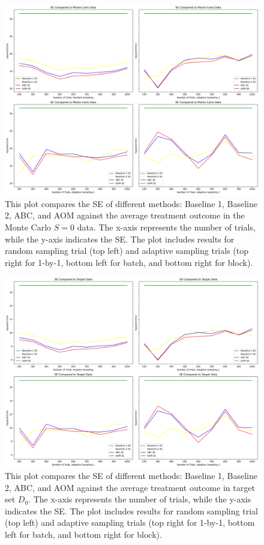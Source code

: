 \documentclass[12pt, oneside]{amsart}
\theoremstyle{definition}
\theoremstyle{remark}
\numberwithin{equation}{section}
\begin{document}
\begin{figure}[hbt!]
    \centering
    \includegraphics[scale=0.15]{Report/Figure/se_mc.jpg}
    \caption{This plot compares the SE of different methods: Baseline 1, Baseline 2, ABC, and AOM against the average treatment outcome in the Monte Carlo $S=0$ data. The x-axis represents the number of trials, while the y-axis indicates the SE. The plot includes results for random sampling trial (top left) and adaptive sampling trials (top right for 1-by-1, bottom left for batch, and bottom right for block).}
    \label{se_mc}
\end{figure}
\FloatBarrier

\begin{figure}[hbt!]
    \centering
    \includegraphics[scale=0.15]{Report/Figure/se_target.jpg}
    \caption{This plot compares the SE of different methods: Baseline 1, Baseline 2, ABC, and AOM against the average treatment outcome in target set $D_0$. The x-axis represents the number of trials, while the y-axis indicates the SE. The plot includes results for random sampling trial (top left) and adaptive sampling trials (top right for 1-by-1, bottom left for batch, and bottom right for block).}
    \label{se_target}
\end{figure}
\FloatBarrier
\end{document}
